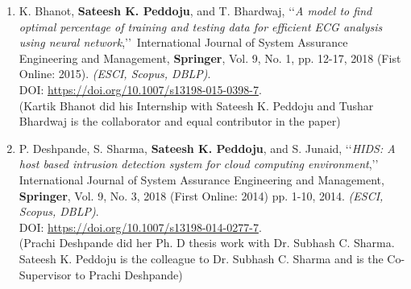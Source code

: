 \begin{enumerate}
	\item
	K. Bhanot, \textbf{Sateesh K. Peddoju}, and T. Bhardwaj, \lq\lq \textit{A model to find optimal percentage of training and testing data for efficient ECG analysis using neural network},\rq\rq\, International Journal of System Assurance Engineering and Management, \textbf{Springer}, Vol. 9, No. 1, pp. 12-17, 2018 (Fist Online: 2015). \emph{(ESCI, Scopus, DBLP)}. \\DOI: \url{https://doi.org/10.1007/s13198-015-0398-7}.
\\ (Kartik Bhanot did his Internship with Sateesh K. Peddoju and Tushar Bhardwaj is the collaborator and equal contributor in the paper)
	
	\item
	P. Deshpande, S. Sharma, \textbf{Sateesh K. Peddoju}, and S. Junaid, \lq\lq \textit{HIDS: A host based intrusion detection system for cloud computing environment},\rq\rq\, International Journal of System Assurance Engineering and Management, \textbf{Springer}, Vol. 9, No. 3, 2018 (First Online: 2014) pp. 1-10, 2014. \emph{(ESCI, Scopus, DBLP)}. \\DOI: \url{https://doi.org/10.1007/s13198-014-0277-7}.  \\(Prachi Deshpande did her Ph. D thesis work with Dr. Subhash C. Sharma. Sateesh K. Peddoju is the colleague to Dr. Subhash C. Sharma and is the Co-Supervisor to Prachi Deshpande)
	
	
\end{enumerate}		